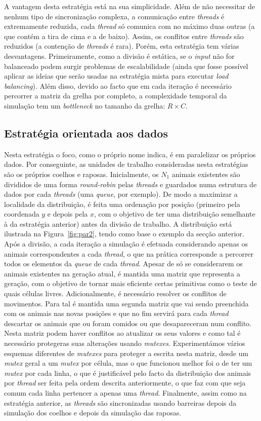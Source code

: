 \documentclass[10pt,a4paper,oneside]{article}
\begin{document}
A vantagem desta estratégia está na sua simplicidade. Além de não
necessitar de nenhum tipo de sincronização complexa, a comunicação
entre \textit{threads} é extremamente reduzida, cada \textit{thread}
só comunica com no máximo duas outras (a que contém a tira de cima e a
de baixo). Assim, os conflitos entre \textit{threads} são reduzidos (a
contenção de \textit{threads} é rara). Porém, esta estratégia tem
várias desvantagens. Primeiramente, como a divisão é estática, se o
\textit{input} não for balanceado podem surgir problemas de
escalabilidade (ainda que fosse possível aplicar as ideias que serão
usadas na estratégia mista para executar \textit{load
  balancing}). Além disso, devido ao facto que em cada iteração é
necessário percorrer a matriz da grelha por completo, a complexidade
temporal da simulação tem um \textit{bottleneck} no tamanho da grelha:
$R \times C$.

\subsection{Estratégia orientada aos dados}
Nesta estratégia o foco, como o próprio nome indica, é em paralelizar
os próprios dados. Por conseguinte, as unidades de trabalho
consideradas nesta estratégias são os próprios coelhos e
raposas. Inicialmente, os $N_1$ animais existentes são divididos de
uma forma \textit{round-robin} pelas \textit{threads} e guardados numa
estrutura de dados por cada \textit{threads} (uma \textit{queue}, por
exemplo). De modo a maximizar a localidade da distribuição, é feita
uma ordenação por posição (primeiro pela coordenada $y$ e depois pela
$x$, com o objetivo de ter uma distribuição semelhante à da estratégia
anterior) antes da divisão de trabalho. A distribuição está ilustrada
na Figura~\ref{fig:par2}, tendo como base o exemplo da secção
anterior. Após a divisão, a cada iteração a simulação é efetuada
considerando apenas os animais correspondentes a cada \textit{thread},
o que na prática corresponde a percorrer todos os elementos da
\textit{queue} de cada \textit{thread}. Apesar de só se considerarem
os animais existentes na geração atual, é mantida uma matriz que
representa a geração, com o objetivo de tornar mais eficiente certas
primitivas como o teste de quais células livres. Adicionalmente, é
necessário resolver os conflitos de movimentos. Para tal é mantida uma
segunda matriz que vai sendo preenchida com os animais nas novas
posições e que no fim servirá para cada \textit{thread} descartar os
animais que ou foram comidos ou que desapareceram num conflito. Nesta
matriz podem haver conflitos ao atualizar os seus valores e como tal é
necessário protegeras suas alterações usando
\textit{mutexes}. Experimentámos vários esquemas diferentes de
\textit{mutexes} para proteger a escrita nesta matriz, desde um
\textit{mutex} geral a um \textit{mutex} por célula, mas o que
funcionou melhor foi o de ter um \textit{mutex} por cada linha, o que
é justificável pelo facto da distribuição dos animais por
\textit{thread} ser feita pela ordem descrita anteriormente, o que faz
com que seja comum cada linha pertencer a apenas uma
\textit{thread}. Finalmente, assim como na estratégia anterior, as
\textit{threads} são sincronizadas usando barreiras depois da
simulação dos coelhos e depois da simulação das raposas.
\end{document}

